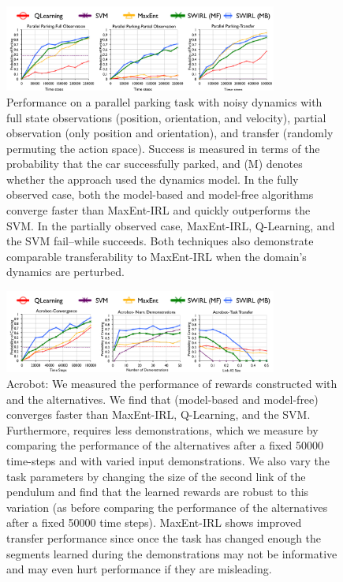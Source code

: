 \begin{figure}[t]
\centering
 \includegraphics[width=0.8\textwidth]{exp/rc-convergence-1.png}
 \caption{Performance on a parallel parking task with noisy dynamics with full state observations (position, orientation, and velocity), partial observation (only position and orientation), and transfer (randomly permuting the action space).
 Success is measured in terms of the probability that the car successfully parked, and (M) denotes whether the approach used the dynamics model.
 In the fully observed case, both the model-based and model-free \hirl algorithms converge faster than MaxEnt-IRL and quickly outperforms the SVM.
 In the partially observed case, MaxEnt-IRL, Q-Learning, and the SVM fail--while \hirl succeeds.
 Both techniques also demonstrate comparable transferability to MaxEnt-IRL when the domain's dynamics are perturbed.
\label{exp:rcsegmentation-res}}
\end{figure}



\begin{figure}[t]
\centering
 \includegraphics[width=0.8\textwidth]{exp/acr-convergence-1.png}
 \caption{Acrobot: We measured the performance of rewards constructed with \hirl and the alternatives. We find that \hirl (model-based and model-free) converges faster than MaxEnt-IRL, Q-Learning, and the SVM.
 Furthermore, \hirl requires less demonstrations, which we measure by comparing the performance of the alternatives after a fixed 50000 time-steps and with varied input demonstrations. 
 We also vary the task parameters by changing the size of the second link of the pendulum and find that the learned rewards are robust to this variation (as before comparing the performance of the alternatives after a fixed 50000 time steps). MaxEnt-IRL shows improved transfer performance since once the task has changed enough the segments learned during the demonstrations may not be informative and may even hurt performance if they are misleading. 
 \label{exp:acsegmentation-res2}}
\end{figure}

